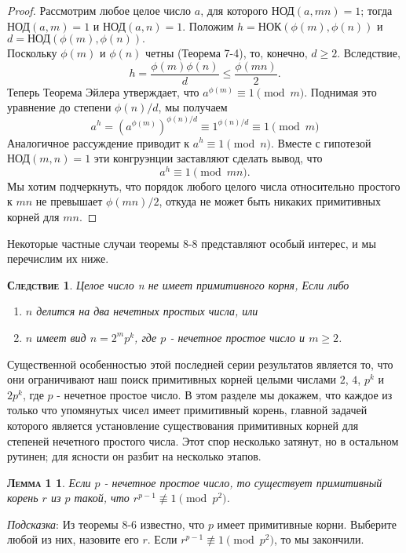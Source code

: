 \documentclass[11pt]{article}
\newtheorem*{lemma_1}{\textsc{Лемма 1}}
\newtheorem*{corollary}{\textsc{Следствие}}
\begin{document}
\newpage
{}

\begin{proof}
Рассмотрим любое целое число $a$, для которого $\text{НОД}(a,mn)=1$; тогда $\text{НОД}(a,m)=1$ и $\text{НОД}(a,n)=1$. Положим $h=\text{НОК}(\phi(m),\phi(n))$ и $d=\text{НОД}(\phi(m),\phi(n)).$ \\
Поскольку $\phi(m)$ и $\phi (n)$ четны (Теорема 7-4), то, конечно, $d \geq 2$. Вследствие,
\begin{equation*}
    h = \frac{\phi(m)\phi(n)}{d} \leq \frac{\phi(mn)}{2}.
\end{equation*}
Теперь Теорема Эйлера утверждает, что $a^{\phi(m)} \equiv 1 \pmod{m}$. Поднимая это уравнение до степени $\phi (n)/d$, мы получаем
\begin{equation*}
    a^h = (a^{\phi(m)})^{\phi(n)/d} \equiv 1^{\phi(n)/d} \equiv 1 \pmod{m}
\end{equation*}
Аналогичное рассуждение приводит к $a^h \equiv 1 \pmod{n}$. Вместе с гипотезой $\text{НОД} (m,n)=1$ эти конгруэнции заставляют сделать вывод, что
\begin{equation*}
    a^h \equiv 1 \pmod{mn}.
\end{equation*}
Мы хотим подчеркнуть, что порядок любого целого числа относительно простого к $mn$ не превышает $\phi (mn)/2$, откуда не может быть никаких примитивных корней для $mn$.
\end{proof}
Некоторые частные случаи теоремы 8-8 представляют особый интерес, и мы перечислим их ниже.
\begin{corollary} \textsl{Целое число n не имеет примитивного корня, Если либо}
\begin{enumerate}
\item $n$ делится на два нечетных простых числа, или
\item $n$ имеет вид $n = 2^{m}p^{k}$, где $p$ - нечетное простое число и $m \geq 2$.
\end{enumerate}
\end{corollary}
\qquad Существенной особенностью этой последней серии результатов является то, что они ограничивают наш поиск примитивных корней целыми числами $2$, $4$, $p^k$ и $2p^k$, где $p$ - нечетное простое число. В этом разделе мы докажем, что каждое из только что упомянутых чисел имеет примитивный корень, главной задачей которого является установление существования примитивных корней для степеней нечетного простого числа. Этот спор несколько затянут, но в остальном рутинен; для ясности он разбит на несколько этапов. \\
\begin{lemma_1}
\textsl{Если $p$ - нечетное простое число, то существует примитивный корень $r$ из $p$ такой, что $r^{p-1} \not\equiv 1 \pmod{p^2}$.}
\end{lemma_1}
\emph{Подсказка}: Из теоремы 8-6 известно, что $p$ имеет примитивные корни. Выберите любой из них, назовите его $r$. Если $r^{p-1} \not\equiv 1 \pmod{p^2}$, то мы закончили.
\end{document}
